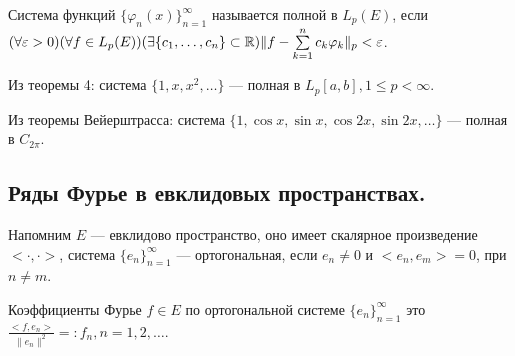 \begin{Def}
	Система функций $\{\varphi_n(x)\}_{n=1}^\infty$ называется полной в $L_p(E)$, если \\$(\forall\varepsilon>0)(\forall f\in L_p(E))(\exists \{c_1,\ldots,c_n\}\subset\mathbb{R})\|f-\sum\limits_{k=1}^n c_k\varphi_k\|_p<\varepsilon$.
\end{Def}

\begin{corollary}
	 Из теоремы 4: система $\{1,x,x^2,\ldots\}$ --- полная в $L_p[a,b], 1\leqslant p<\infty$.
\end{corollary}
 
\begin{corollary}
	Из теоремы Вейерштрасса: система $\{1,\cos x,\sin x, \cos 2x, \sin 2x,\ldots\}$ --- полная в $C_{2\pi}$.
\end{corollary}

\subsection{Ряды Фурье в евклидовых пространствах.}
Напомним $E$ --- евклидово пространство, оно имеет скалярное произведение $<\cdot,\cdot>$, система $\{e_n\}_{n=1}^\infty$ --- ортогональная, если $e_n\ne 0$ и $<e_n,e_m>=0$, при $n\ne m$.

Коэффициенты Фурье $f\in E$ по ортогональной системе $\{e_n\}_{n=1}^\infty$ это $\frac{<f,e_n>}{\|e_n\|^2}=:f_n, n=1,2,\ldots$.

